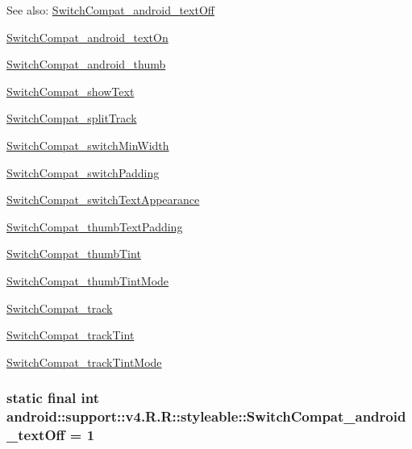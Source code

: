 \begin{Desc}
\item[See also:]\hyperlink{classandroid_1_1support_1_1v4_1_1_r_1_1styleable_475ea27dd698f2f7fb83ff65423189c3}{SwitchCompat\_\-android\_\-textOff} 

\hyperlink{classandroid_1_1support_1_1v4_1_1_r_1_1styleable_8198d90992e4ff6dfd99cdd17ff4deef}{SwitchCompat\_\-android\_\-textOn} 

\hyperlink{classandroid_1_1support_1_1v4_1_1_r_1_1styleable_2499279c732b44c04537677dfc6988b4}{SwitchCompat\_\-android\_\-thumb} 

\hyperlink{classandroid_1_1support_1_1v4_1_1_r_1_1styleable_0cc5a1a2d3ed39ddffe812e716bf2ef4}{SwitchCompat\_\-showText} 

\hyperlink{classandroid_1_1support_1_1v4_1_1_r_1_1styleable_a0d331497170a5613b2fe77a4e795649}{SwitchCompat\_\-splitTrack} 

\hyperlink{classandroid_1_1support_1_1v4_1_1_r_1_1styleable_98a2bf49a68fe279d68595eef6c847a2}{SwitchCompat\_\-switchMinWidth} 

\hyperlink{classandroid_1_1support_1_1v4_1_1_r_1_1styleable_86212afa1c1fecc95d7678773e2d9e52}{SwitchCompat\_\-switchPadding} 

\hyperlink{classandroid_1_1support_1_1v4_1_1_r_1_1styleable_60389d42c7e89427896a6b7567ba54a5}{SwitchCompat\_\-switchTextAppearance} 

\hyperlink{classandroid_1_1support_1_1v4_1_1_r_1_1styleable_8ad125e9cbf83b9f8f070fdeab78cbbe}{SwitchCompat\_\-thumbTextPadding} 

\hyperlink{classandroid_1_1support_1_1v4_1_1_r_1_1styleable_136537e09affe833ba67adc81baf4df6}{SwitchCompat\_\-thumbTint} 

\hyperlink{classandroid_1_1support_1_1v4_1_1_r_1_1styleable_6e084fdf50ded0b3372355ed70bb4849}{SwitchCompat\_\-thumbTintMode} 

\hyperlink{classandroid_1_1support_1_1v4_1_1_r_1_1styleable_e711e9fa38386ec6f701a57cc3ac8c6e}{SwitchCompat\_\-track} 

\hyperlink{classandroid_1_1support_1_1v4_1_1_r_1_1styleable_d119b35aaef8f728924d474d789a2286}{SwitchCompat\_\-trackTint} 

\hyperlink{classandroid_1_1support_1_1v4_1_1_r_1_1styleable_dd018911d038be332e08eef22a606e52}{SwitchCompat\_\-trackTintMode} \end{Desc}
\hypertarget{classandroid_1_1support_1_1v4_1_1_r_1_1styleable_475ea27dd698f2f7fb83ff65423189c3}{
\subsubsection[{SwitchCompat\_\-android\_\-textOff}]{\setlength{\rightskip}{0pt plus 5cm}static final int android::support::v4.R.R::styleable::SwitchCompat\_\-android\_\-textOff = 1}}
